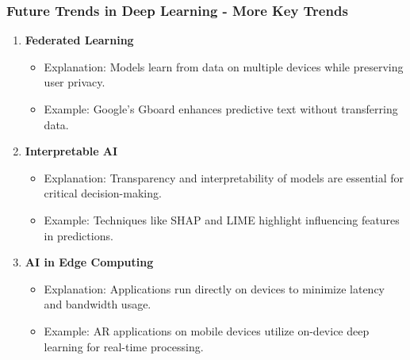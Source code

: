 \documentclass[aspectratio=169]{beamer}
\begin{document}
\begin{frame}[fragile]
    \frametitle{Future Trends in Deep Learning - More Key Trends}
    \begin{enumerate}[resume]
        \item \textbf{Federated Learning}
            \begin{itemize}
                \item Explanation: Models learn from data on multiple devices while preserving user privacy.
                \item Example: Google’s Gboard enhances predictive text without transferring data.
            \end{itemize}
        
        \item \textbf{Interpretable AI}
            \begin{itemize}
                \item Explanation: Transparency and interpretability of models are essential for critical decision-making.
                \item Example: Techniques like SHAP and LIME highlight influencing features in predictions.
            \end{itemize}
        
        \item \textbf{AI in Edge Computing}
            \begin{itemize}
                \item Explanation: Applications run directly on devices to minimize latency and bandwidth usage.
                \item Example: AR applications on mobile devices utilize on-device deep learning for real-time processing.
            \end{itemize}
    \end{enumerate}
\end{frame}
\end{document}
